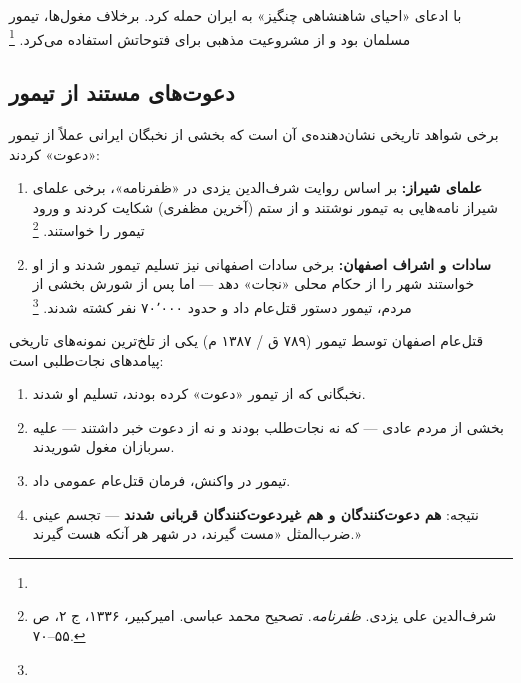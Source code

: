  با ادعای «احیای شاهنشاهی چنگیز» به ایران حمله کرد. برخلاف مغول‌ها، تیمور مسلمان بود و از مشروعیت مذهبی برای فتوحاتش استفاده می‌کرد.%
\footnote{}

\subsection{دعوت‌های مستند از تیمور}
\label{subsec:ch05-timur-invitation}

برخی شواهد تاریخی نشان‌دهنده‌ی آن است که بخشی از نخبگان ایرانی عملاً از تیمور «دعوت» کردند:

\begin{enumerate}[nosep, label=\textbf{\arabic*.}]
  \item \textbf{علمای شیراز:} بر اساس روایت شرف‌الدین یزدی در «ظفرنامه»، برخی علمای شیراز نامه‌هایی به تیمور نوشتند و از ستم  (آخرین مظفری) شکایت کردند و ورود تیمور را خواستند.%
  \footnote{شرف‌الدین علی یزدی. \textit{ظفرنامه}. تصحیح محمد عباسی. امیرکبیر، ۱۳۳۶، ج ۲، ص ۵۵--۷۰.}

  \item \textbf{سادات و اشراف اصفهان:} برخی سادات اصفهانی نیز تسلیم تیمور شدند و از او خواستند شهر را از حکام محلی «نجات» دهد — اما پس از شورش بخشی از مردم، تیمور دستور قتل‌عام داد و حدود ۷۰٬۰۰۰ نفر کشته شدند.%
  \footnote{}
\end{enumerate}

\begin{tcolorbox}[enemybox, title={فاجعه‌ی اصفهان: درس تاریخی نجات‌طلبی}]
قتل‌عام اصفهان توسط تیمور (۷۸۹ ق / ۱۳۸۷ م) یکی از تلخ‌ترین نمونه‌های تاریخی پیامدهای نجات‌طلبی است:
\begin{enumerate}[nosep, label=\textbf{\arabic*.}]
  \item نخبگانی که از تیمور «دعوت» کرده بودند، تسلیم او شدند.
  \item بخشی از مردم عادی — که نه نجات‌طلب بودند و نه از دعوت خبر داشتند — علیه سربازان مغول شوریدند.
  \item تیمور در واکنش، فرمان قتل‌عام عمومی داد.
  \item نتیجه: \textbf{هم دعوت‌کنندگان و هم غیردعوت‌کنندگان قربانی شدند} — تجسم عینی ضرب‌المثل «مست گیرند، در شهر هر آنکه هست گیرند.»
\end{enumerate}
\end{tcolorbox}


